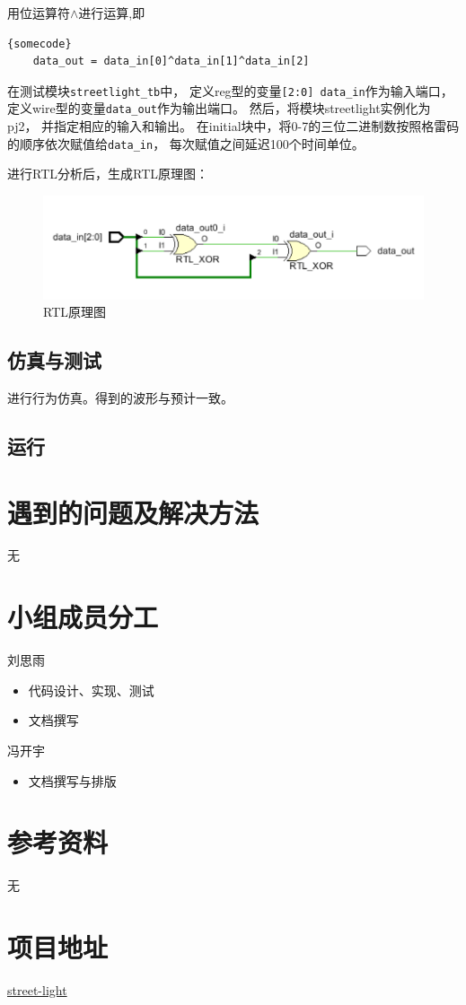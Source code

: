 \documentclass[UTF8]{article}
\begin{document}
用位运算符$\wedge$进行运算,即
\lstset{language=verilog}
\begin{lstlisting}[frame=tb]{somecode}
    data_out = data_in[0]^data_in[1]^data_in[2]
\end{lstlisting}

在测试模块\lstinline{streetlight_tb}中，
定义reg型的变量\lstinline{[2:0] data_in}作为输入端口，
定义wire型的变量\lstinline{data_out}作为输出端口。
然后，将模块streetlight实例化为pj2，
并指定相应的输入和输出。
在initial块中，将0-7的三位二进制数按照格雷码的顺序依次赋值给\lstinline{data_in}，
每次赋值之间延迟100个时间单位。

进行RTL分析后，生成RTL原理图：
​
\begin{figure}[htbp]
    \centering
    \includegraphics[scale=0.7]{0.png}
    \caption{RTL原理图}
\end{figure}

\subsection{仿真与测试}
进行行为仿真。得到的波形与预计一致。
\subsection{运行}

\section{遇到的问题及解决方法}
无

\section{小组成员分工}
刘思雨
\begin{itemize}
    \item 代码设计、实现、测试
    \item 文档撰写
\end{itemize}

冯开宇
\begin{itemize}
    \item 文档撰写与排版
\end{itemize}
\section{参考资料}
无

\section{项目地址}

\href{https://github.com/bit-logic-computer-design-2019/street-light}{street-light}
\end{document}
